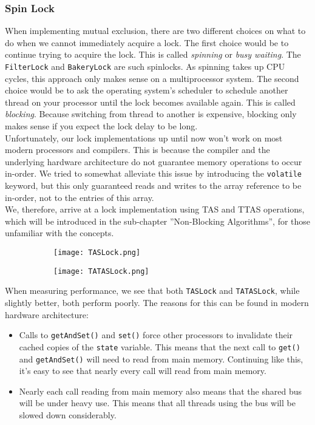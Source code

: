 \documentclass[main]{subfiles}
\begin{document}

\subsubsection{Spin Lock}
When implementing mutual exclusion, there are two different choices on what to do when we cannot immediately acquire a lock. The first choice would be to continue trying to acquire the lock. This is called \textit{spinning} or \textit{busy waiting}. The \texttt{FilterLock} and \texttt{BakeryLock} are such spinlocks. As spinning takes up CPU cycles, this approach only makes sense on a multiprocessor system. The second choice would be to ask the operating system's scheduler to schedule another thread on your processor until the lock becomes available again. This is called \textit{blocking}. Because switching from thread to another is expensive, blocking only makes sense if you expect the lock delay to be long.\\[3mm]
Unfortunately, our lock implementations up until now won't work on most modern processors and compilers. This is because the compiler and the underlying hardware architecture do not guarantee memory operations to occur in-order. We tried to  somewhat alleviate this issue by introducing the \texttt{volatile} keyword, but this only guaranteed reads and writes to the array reference to be in-order, not to the entries of this array.\\[3mm]
We, therefore, arrive at a lock implementation using TAS and TTAS operations, which will be introduced in the sub-chapter ''Non-Blocking Algorithms'', for those unfamiliar with the concepts.
\begin{figure}[h]
    \centering
    \begin{subfigure}{.5\textwidth}
        \centering
        \texttt{[image: TASLock.png]}
    \end{subfigure}%
    \begin{subfigure}{.5\textwidth}
        \centering
        \texttt{[image: TATASLock.png]}
    \end{subfigure}
\end{figure}
When measuring performance, we see that both \texttt{TASLock} and \texttt{TATASLock}, while slightly better, both perform poorly. The reasons for this can be found in modern hardware architecture:
\begin{itemize}
    \item Calls to \texttt{getAndSet()} and \texttt{set()} force other processors to invalidate their cached copies of the \texttt{state} variable. This means that the next call to \texttt{get()} and \texttt{getAndSet()} will need to read from main memory. Continuing like this, it's easy to see that nearly every call will read from main memory.
    \item Nearly each call reading from main memory also means that the shared bus will be under heavy use. This means that all threads using the bus will be slowed down considerably.
\end{itemize}
\end{document}
